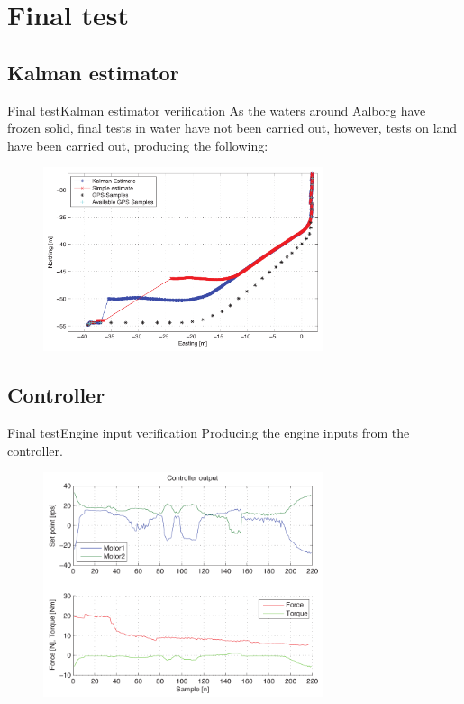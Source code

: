 \documentclass[10pt]{beamer}
\begin{document}
\section{Final test}
\subsection{Kalman estimator}
\begin{frame}{Final test}{Kalman estimator verification}
As the waters around Aalborg have frozen solid, final tests in water have not been carried out, however, tests on land have been carried out, producing the following:
\begin{figure}
			\begin{center}
				\includegraphics[width=8.2cm]{img/kalmanestimate}
				\label{fig:kalmanestimate}
			\end{center}
		\end{figure}
\end{frame}

\subsection{Controller}
\begin{frame}{Final test}{Engine input verification}
Producing the engine inputs from the controller.
\begin{figure}
			\begin{center}
				\includegraphics[width=8.2cm]{img/motorinput}
				\label{fig:motorinput}
			\end{center}
		\end{figure}
\end{frame}
\end{document}
